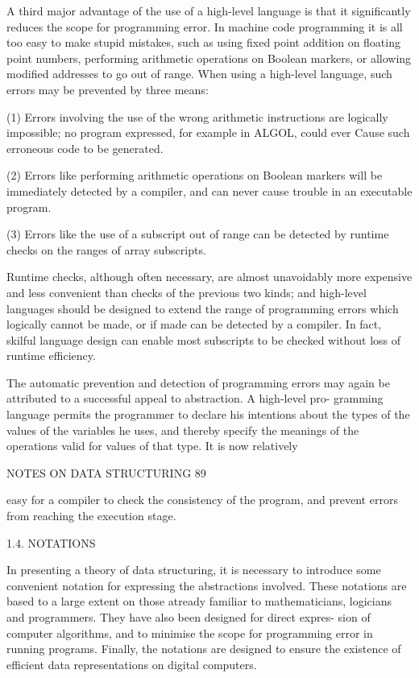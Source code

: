 A third major advantage of the use of a high-level language is that it significantly reduces the scope for programming error. In machine code programming it is all too easy to make stupid mistakes, such as using fixed point addition on floating point numbers, performing arithmetic operations on Boolean markers, or allowing modified addresses to go out of range. When using a high-level language, such errors may be prevented by three means:

(1) Errors involving the use of the wrong arithmetic instructions are logically impossible; no program expressed, for example in ALGOL, could ever Cause such erroneous code to be generated.

(2) Errors like performing arithmetic operations on Boolean markers will be immediately detected by a compiler, and can never cause trouble in an executable program.

(3) Errors like the use of a subscript out of range can be detected by runtime checks on the ranges of array subscripts.

Runtime checks, although often necessary, are almost unavoidably more expensive and less convenient than checks of the previous two kinds; and high-level languages should be designed to extend the range of programming errors which logically cannot be made, or if made can be detected by a compiler. In fact, skilful language design can enable most subscripts to be checked without loss of runtime efficiency.

The automatic prevention and detection of programming errors may again be attributed to a successful appeal to abstraction. A high-level pro- gramming language permits the programmer to declare his intentions about the types of the values of the variables he uses, and thereby specify the meanings of the operations valid for values of that type. It is now relatively

NOTES ON DATA STRUCTURING 89

easy for a compiler to check the consistency of the program, and prevent errors from reaching the execution stage.

1.4. NOTATIONS

In presenting a theory of data structuring, it is necessary to introduce some convenient notation for expressing the abstractions involved. These notations are based to a large extent on those atready familiar to mathematicians, logicians and programmers. They have also been designed for direct expres- sion of computer algorithms, and to minimise the scope for programming error in running programs. Finally, the notations are designed to ensure the existence of efficient data representations on digital computers.

